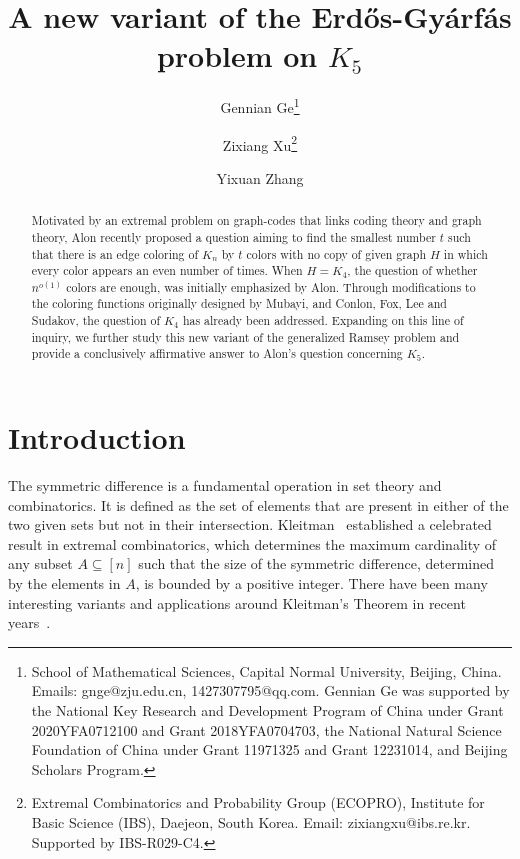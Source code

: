 \documentclass[11pt]{article}
\title{A new variant of the Erd\H{o}s-Gy\'{a}rf\'{a}s problem on $K_{5}$ }
\author{
Gennian Ge\thanks{School of Mathematical Sciences, Capital Normal University, Beijing, China. Emails: gnge@zju.edu.cn, 1427307795@qq.com. Gennian Ge was supported by the National Key Research and Development Program of China under Grant 2020YFA0712100 and Grant 2018YFA0704703, the National Natural Science Foundation of China under Grant 11971325 and Grant 12231014, and Beijing Scholars Program.}
\and 
Zixiang Xu\thanks{Extremal Combinatorics and Probability Group (ECOPRO), Institute for Basic Science (IBS), Daejeon, South Korea. Email: zixiangxu@ibs.re.kr. Supported by IBS-R029-C4.}
\and
Yixuan Zhang\footnotemark[1]
}
\theoremstyle{definition}
\begin{document}
\maketitle
\begin{abstract}
 Motivated by an extremal problem on graph-codes that links coding theory and graph theory, Alon recently proposed a question aiming to find the smallest number $t$ such that there is an edge coloring of $K_{n}$ by $t$ colors with no copy of given graph $H$ in which every color appears an even number of times. When $H=K_{4}$, the question of whether $n^{o(1)}$ colors are enough, was initially emphasized by Alon. Through modifications to the coloring functions originally designed by Mubayi, and Conlon, Fox, Lee and Sudakov, the question of $K_{4}$ has already been addressed. Expanding on this line of inquiry, we further study this new variant of the generalized Ramsey problem and provide a conclusively affirmative answer to Alon's question concerning $K_{5}$.
\end{abstract}


\section{Introduction}
The symmetric difference is a fundamental operation in set theory and combinatorics. It is defined as the set of elements that are present in either of the two given sets but not in their intersection. Kleitman~\cite{1966Kleitman} established a celebrated result in extremal combinatorics, which determines the maximum cardinality of any subset $A\subseteq [n]$ such that the size of the symmetric difference, determined by the elements in $A$, is bounded by a positive integer. There have been many interesting variants and applications around Kleitman's Theorem in recent years~\cite{2017COdingadversarial,2022neighbor,2018CoolingCode,2023Kneighborly,2017CPCFrankl,2023GaoLiuXu,2020Huang,2003CPCSudakov,2017JCTAHamming}.
\end{document}
